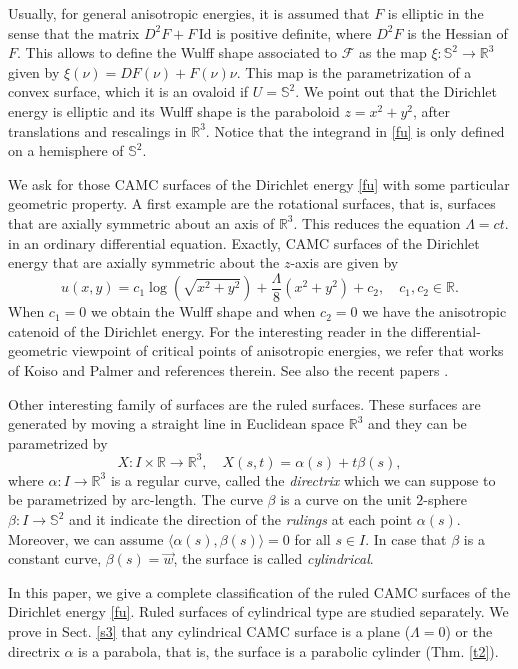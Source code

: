 \documentclass[12pt,a4paper,reqno]{amsart}
\def\r{\mathbb R}
\def\s{\mathbb S}
\begin{document}
Usually, for general anisotropic energies, it is assumed that    $F$ is elliptic  in the sense that the matrix  $D^2F+F\, \mbox{Id}$ is positive definite, where  $D^2F$ is the Hessian of $F$. This allows to define the Wulff shape associated to $\mathcal{F}$ as   the map $\xi\colon\s^2\to\r^3$ given  by $\xi(\nu)=DF(\nu)+F(\nu)\nu$. This map is the parametrization of a convex surface, which it is an ovaloid if   $U=\s^2$. We point out that   the Dirichlet energy    is elliptic and its Wulff shape is  the paraboloid  $z=x^2+y^2$, after translations and rescalings  in $\r^3$. Notice that the integrand in \eqref{fu} is only defined on a hemisphere of $\s^2$.
 
We   ask for those CAMC surfaces of the Dirichlet energy \eqref{fu} with some particular geometric property. A first example are  the rotational surfaces, that is, surfaces that are axially symmetric about an axis of $\r^3$. This reduces the equation $\Lambda=ct.$ in an ordinary differential equation. Exactly, CAMC surfaces of the Dirichlet energy that are   axially symmetric about the $z$-axis are given by 
 $$u(x,y)= c_1\log(\sqrt{x^2+y^2})+\frac{\Lambda}{8}(x^2+y^2)+c_2,\quad c_1,c_2\in\r.$$
When $c_1=0$ we obtain the Wulff shape and when $c_2=0$ we have the anisotropic catenoid of the Dirichlet energy. For the interesting reader in the differential-geometric viewpoint of   critical points of anisotropic energies, we refer that works of Koiso and Palmer  \cite{kp2,kp3,kp5,kp4} and references therein.  See also the recent papers \cite{ba,gmt,gx,jw,ro}. 

Other interesting family of surfaces are the ruled surfaces. These surfaces are generated by moving a straight line in Euclidean space $\r^3$ and they can be parametrized by 
\begin{equation}\label{para1}
X\colon I\times\r\to\r^3,\quad X(s,t)=\alpha(s)+t\beta(s),
\end{equation}
where $\alpha \colon I\to\r^3$ is a regular curve, called the {\it directrix} which we can suppose to be parametrized by arc-length. The curve $\beta$ is a curve on the unit $2$-sphere $\beta\colon I\to\s^2$ and it indicate the direction of the {\it rulings} at each point $\alpha(s)$. Moreover, we can assume $\langle \alpha(s),\beta(s)\rangle=0$ for all $s\in I$. In case that $\beta$ is a constant curve, $\beta(s)=\vec{w}$, the surface is called {\it cylindrical}. 

 In this paper, we give a complete classification of the ruled CAMC surfaces of the Dirichlet energy \eqref{fu}. Ruled surfaces of cylindrical type are studied separately. We prove in Sect. \ref{s3} that any cylindrical CAMC surface is a plane ($\Lambda=0$) or the directrix $\alpha$ is a parabola, that is, the surface is a parabolic cylinder (Thm. \ref{t2}). 
 
\end{document}
